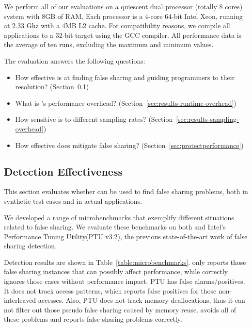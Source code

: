 \label{sec:evaluation}

We perform all of our evaluations on a quiescent dual processor (totally 8 cores) system with 8GB of RAM. Each processor is a 4-core 64-bit Intel Xeon, running at 2.33 Ghz with a 4MB L2 cache. For compatibility reasons, we compile all applications to a 32-bit target using the GCC compiler. All performance data is the average of ten runs, excluding the maximum and minimum values.

The evaluation answers the following questions:

\begin{itemize}
\item How effective is \sheriffdetect{} at finding false sharing and guiding programmers to their resolution? (Section~\ref{sec:effecteval})
\item What is \sheriffdetect{}'s performance overhead? (Section~\ref{sec:results-runtime-overhead})
\item How sensitive is \sheriffdetect{} to different sampling rates? (Section~\ref{sec:results-sampling-overhead}) 
\item How effective does \sheriffprotect{} mitigate false sharing? (Section~\ref{sec:protectperformance})
\end{itemize}

\subsection{Detection Effectiveness}

\label{sec:effecteval}

This section evaluates whether \sheriffdetect{} can be used to find false sharing problems, both in synthetic test cases and in actual applications.

We developed a range of microbenchmarks that exemplify different situations related to false sharing. We evaluate these benchmarks on both \SheriffDetect{} and Intel's Performance Tuning Utility(PTU v3.2), the previous state-of-the-art work of false sharing detection. 

Detection results are shown in Table~\ref{table:microbenchmarks}. \sheriffdetect{} only reports those false sharing instances that can possibly affect performance, while correctly ignores those cases without performance impact.
PTU has false alarms/positives.  It does not track access patterns, which reports false positives for those non-interleaved accesses. Also, PTU does not track memory deallocations, thus it can not filter out those pseudo false sharing caused by memory reuse. \sheriffdetect{} avoids all of these problems and reports false sharing problems correctly. 



